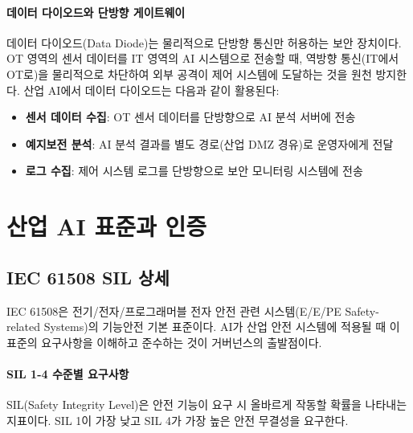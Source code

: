 \paragraph{데이터 다이오드와 단방향 게이트웨이}

데이터 다이오드(Data Diode)는 물리적으로 단방향 통신만 허용하는 보안 장치이다. OT 영역의 센서 데이터를 IT 영역의 AI 시스템으로 전송할 때, 역방향 통신(IT에서 OT로)을 물리적으로 차단하여 외부 공격이 제어 시스템에 도달하는 것을 원천 방지한다. 산업 AI에서 데이터 다이오드는 다음과 같이 활용된다:

\begin{itemize}
    \item \textbf{센서 데이터 수집}: OT 센서 데이터를 단방향으로 AI 분석 서버에 전송
    \item \textbf{예지보전 분석}: AI 분석 결과를 별도 경로(산업 DMZ 경유)로 운영자에게 전달
    \item \textbf{로그 수집}: 제어 시스템 로그를 단방향으로 보안 모니터링 시스템에 전송
\end{itemize}

\section{산업 AI 표준과 인증}
\label{sec:19.2}

\subsection{IEC 61508 SIL 상세}
\label{sec:19.2.1}

IEC 61508은 전기/전자/프로그래머블 전자 안전 관련 시스템(E/E/PE Safety-related Systems)의 기능안전 기본 표준이다. AI가 산업 안전 시스템에 적용될 때 이 표준의 요구사항을 이해하고 준수하는 것이 거버넌스의 출발점이다.

\paragraph{SIL 1-4 수준별 요구사항}

SIL(Safety Integrity Level)은 안전 기능이 요구 시 올바르게 작동할 확률을 나타내는 지표이다. SIL 1이 가장 낮고 SIL 4가 가장 높은 안전 무결성을 요구한다.

